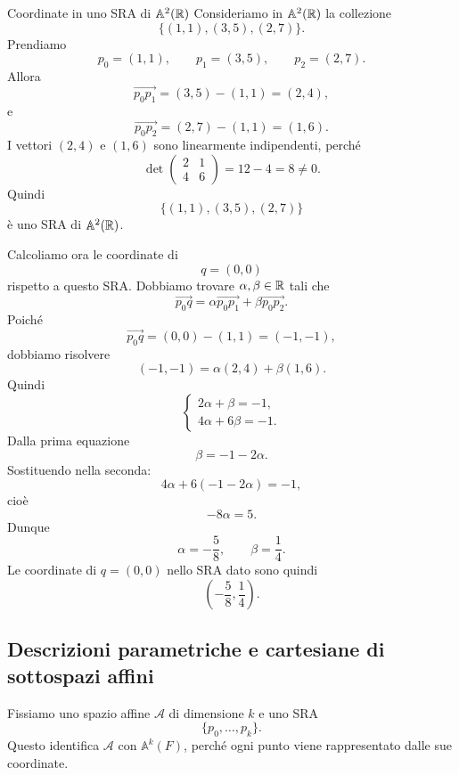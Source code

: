\documentclass[a4paper]{article}
\begin{document}
\begin{snippetexample}{Coordinate in uno SRA di \(\mathbb{A}^2(\mathbb{R})\)}
    Consideriamo in \(\mathbb{A}^2(\mathbb{R})\) la collezione
    \[
        \{(1,1),(3,5),(2,7)\}.
    \]
    Prendiamo
    \[
        p_0=(1,1),
        \qquad
        p_1=(3,5),
        \qquad
        p_2=(2,7).
    \]
    Allora
    \[
        \overrightarrow{p_0p_1}=(3,5)-(1,1)=(2,4),
    \]
    e
    \[
        \overrightarrow{p_0p_2}=(2,7)-(1,1)=(1,6).
    \]
    I vettori \((2,4)\) e \((1,6)\) sono linearmente indipendenti, perché
    \[
        \det
        \begin{pmatrix}
            2 & 1\\
            4 & 6
        \end{pmatrix}
        =
        12-4
        =
        8\neq 0.
    \]
    Quindi
    \[
        \{(1,1),(3,5),(2,7)\}
    \]
    è uno SRA di \(\mathbb{A}^2(\mathbb{R})\).

    Calcoliamo ora le coordinate di
    \[
        q=(0,0)
    \]
    rispetto a questo SRA. Dobbiamo trovare \(\alpha,\beta\in\mathbb{R}\) tali che
    \[
        \overrightarrow{p_0q}
        =
        \alpha\overrightarrow{p_0p_1}
        +
        \beta\overrightarrow{p_0p_2}.
    \]
    Poiché
    \[
        \overrightarrow{p_0q}=(0,0)-(1,1)=(-1,-1),
    \]
    dobbiamo risolvere
    \[
        (-1,-1)=\alpha(2,4)+\beta(1,6).
    \]
    Quindi
    \[
        \begin{cases}
            2\alpha+\beta=-1,\\
            4\alpha+6\beta=-1.
        \end{cases}
    \]
    Dalla prima equazione
    \[
        \beta=-1-2\alpha.
    \]
    Sostituendo nella seconda:
    \[
        4\alpha+6(-1-2\alpha)=-1,
    \]
    cioè
    \[
        -8\alpha=5.
    \]
    Dunque
    \[
        \alpha=-\frac{5}{8},
        \qquad
        \beta=\frac{1}{4}.
    \]
    Le coordinate di \(q=(0,0)\) nello SRA dato sono quindi
    \[
        \left(-\frac{5}{8},\frac{1}{4}\right).
    \]
\end{snippetexample}

\subsection{Descrizioni parametriche e cartesiane di sottospazi affini}

Fissiamo uno spazio affine \(\mathcal{A}\) di dimensione \(k\) e uno SRA
\[
    \{p_0,\ldots,p_k\}.
\]
Questo identifica \(\mathcal{A}\) con \(\mathbb{A}^k(F)\), perché ogni punto viene rappresentato dalle sue coordinate.
\end{document}
